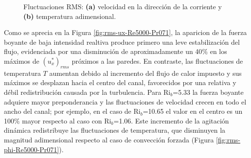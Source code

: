 \begin{figure}[H]
  \centering
    \caption{Fluctuaciones RMS: \textbf{(a)} velocidad en la dirección de la corriente y \textbf{(b)} temperatura adimensional.}
    \label{fig:rms-Re5000-Pr071}
\end{figure}

Como se aprecia en la Figura \ref{fig:rms-ux-Re5000-Pr071}, la aparicion de la fuerza boyante de baja intensidad realtiva produce primero una leve estabilización del flujo, evidenciada por una disminución de aproximadamente un 40$\%$ en los máximos de $(u^*_x)_{rms}$ próximos a las paredes. En contraste, las fluctuaciones de temperatura $T$ aumentan debido al incremento del flujo de calor impuesto y sus máximos se desplazan hacia el centro del canal, favorecidos por una relativa y débil redistribución causada por la turbulencia. Para Ri$_b$=5.33 la fuerza boyante adquiere mayor preponderancia y las fluctuaciones de velocidad crecen en todo el ancho del canal; por ejemplo, en el caso de Ri$_b$=10.65 el valor en el centro es un 100$\%$ mayor respecto al caso con Ri$_b$=1.06. Este incremento de la agitación dinámica redistribuye las fluctuaciones de temperatura, que disminuyen la magnitud adimensional respecto al caso de convección forzada (Figura \ref{fig:rms-phi-Re5000-Pr071}).

